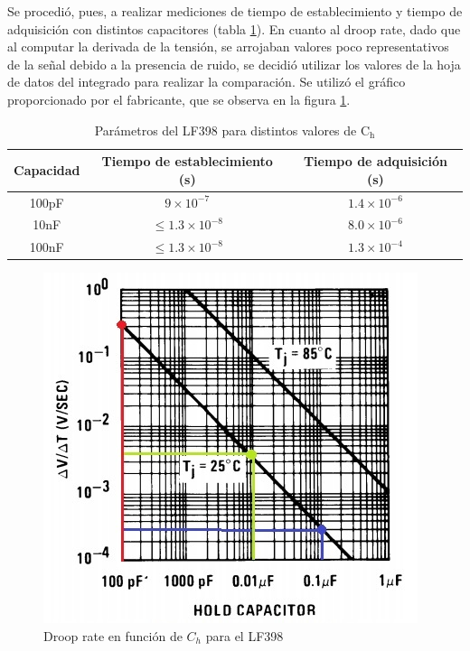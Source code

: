 \documentclass{article}
\begin{document}
Se procedi\'o, pues, a realizar mediciones de tiempo de establecimiento y tiempo de adquisici\'on con distintos capacitores (tabla \ref{table:sh_mediciones}). En cuanto al droop rate, dado que al computar la derivada de la tensi\'on, se arrojaban valores poco representativos de la se\~nal debido a la presencia de ruido, se decidi\'o utilizar los valores de la hoja de datos del integrado para realizar la comparaci\'on. Se utiliz\'o el gr\'afico proporcionado por el fabricante, que se observa en la figura \ref{fig:droop_rate}.


\begin{table}[htb]     
	\centering     
	\begin{tabular}{|c|c|c|}         
	\hline         Capacidad & Tiempo de establecimiento (s) & Tiempo de adquisici\'on (s)  \\ \hline \hline         
	100pF     & $9\times 10^{-7}$             & $1.4\times 10^{-6}$                                   \\ \hline         
	10nF      & $\leq 1.3\times 10^{-8}$      & $8.0\times 10^{-6}$                                                   \\ \hline
	100nF     & $\leq 1.3\times 10^{-8}$      & $1.3\times 10^{-4}$                                                 \\ \hline
    \end{tabular}     
	\caption{Par\'ametros del LF398 para distintos valores de $\mathrm{C}_\mathrm{h}$}     
	\label{table:sh_mediciones} 
\end{table}

\begin{figure}[htb]     
	\centering     
	\includegraphics[scale=0.7]{sh/droop_rate.jpg}     
	\caption{Droop rate en funci\'on de $C_h$ para el LF398}     
	\label{fig:droop_rate} 
\end{figure}
\end{document}
